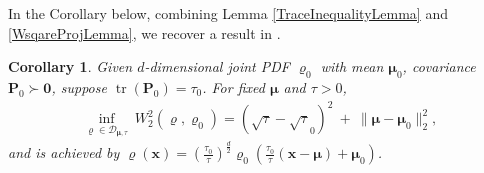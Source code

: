 \documentclass[letterpaper,10pt,twocolumn,conference]{ieeeconf}
\newtheorem{corollary}{Corollary}
\newcommand{\cD}{{\mathscr{D}}}
\newcommand{\tr}{\operatorname{tr}}
\begin{document}
In the Corollary below, combining Lemma \ref{TraceInequalityLemma} and \ref{WsqareProjLemma}, we recover a result in \cite[Theorem 3.1]{CarlenGangbo2003}. %




\begin{corollary}\label{RecoverCarlenGangboThm3.1}
	Given $d$-dimensional joint PDF $\varrho_{0}$ with mean $\bm{\mu}_{0}$, covariance $\bm{P}_{0} \succ \bm{0}$, suppose $\tr(\bm{P}_{0}) = \tau_{0}$. For fixed $\bm{\mu}$ and $\tau>0$,
	\begin{eqnarray}
	\underset{\varrho\in\cD_{\bm{\mu},\tau}}{\inf} \: W_{2}^{2}\left(\varrho,\varrho_{0}\right) = \left(\sqrt{\tau} - \sqrt{\tau}_{0}\right)^{2} \: + \: \parallel \bm{\mu} - \bm{\mu}_{0} \parallel_{2}^{2}, 
	\label{WassCarlenGangbo}	
	\end{eqnarray}
and is achieved by $\varrho(\bm{x}) = \left(\frac{\tau_{0}}{\tau}\right)^{\frac{d}{2}} \varrho_{0}\left(\frac{\tau_{0}}{\tau}\left(\bm{x} - \bm{\mu}\right) + \bm{\mu}_{0}\right)$.
\end{corollary}
\end{document}
